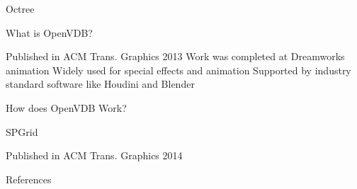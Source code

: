 \begin{frame}{Octree}

\end{frame}

\begin{frame}{What is OpenVDB?}
  \begin{outline}
    \1 Published in ACM Trans. Graphics 2013 \cite{Museth2013}
    \1 Work was completed at Dreamworks animation
    \1 Widely used for special effects and animation
      \2 Supported by industry standard software like Houdini and Blender
  \end{outline}
\end{frame}

\begin{frame}{How does OpenVDB Work?}

\end{frame}

\begin{frame}{SPGrid}
  \begin{outline}
    \1 Published in ACM Trans. Graphics 2014 \cite{Setaluri2014}
  \end{outline}
\end{frame}

\begin{frame}[allowframebreaks]{References}
\tiny
\printbibliography
\end{frame}


